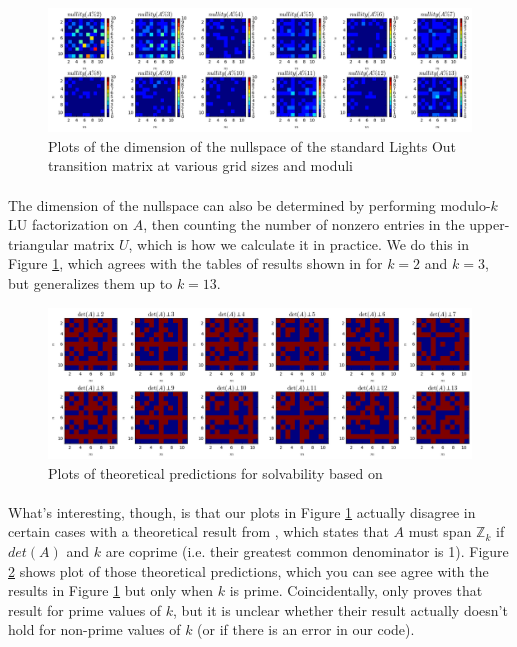 \documentclass[11pt]{article}
\begin{document}
\begin{figure}
\caption{Plots of the dimension of the nullspace of the standard Lights Out transition matrix at various grid sizes and moduli}
\label{nullity}
\includegraphics[width=\textwidth]{nullity.png}
\end{figure}

\paragraph{} The dimension of the nullspace can also be determined by performing modulo-$k$ LU factorization on $A$, then counting the number of nonzero entries in the upper-triangular matrix $U$, which is how we calculate it in practice. We do this in Figure \ref{nullity}, which agrees with the tables of results shown in \cite{jaap} for $k=2$ and $k=3$, but generalizes them up to $k=13$.

\begin{figure}
\caption{Plots of theoretical predictions for solvability based on \cite{involve}}
\label{relprime}
\includegraphics[width=\textwidth]{relprime.png}
\end{figure}

\paragraph{} What's interesting, though, is that our plots in Figure \ref{nullity} actually disagree in certain cases with a theoretical result from \cite{involve}, which states that $A$ must span $\mathbb{Z}_k$ if $det(A)$ and $k$ are coprime (i.e. their greatest common denominator is 1). Figure \ref{relprime} shows plot of those theoretical predictions, which you can see agree with the results in Figure \ref{nullity} but only when $k$ is prime. Coincidentally, \cite{involve} only proves that result for prime values of $k$, but it is unclear whether their result actually doesn't hold for non-prime values of $k$ (or if there is an error in our code).
\end{document}
